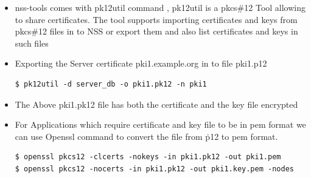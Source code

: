 \documentclass[12pt]{report}
\begin{document}
\begin{enumerate}[label*=\arabic*.]
\begin{itemize}
            \item nss-tools comes with pk12util command , pk12util is a pkcs\#12 Tool allowing to share certificates. The tool supports importing certificates and keys from pkcs\#12 files in to NSS or export them and also list certificates and keys in such files

            \item Exporting the Server certificate pki1.example.org in to file pki1.p12 
                \begin{lstlisting}[style=BashInputStyle]
$ pk12util -d server_db -o pki1.pk12 -n pki1
                \end{lstlisting}

            \item The Above pki1.pk12 file has both the certificate and the key file encrypted

            \item For Applications which require certificate and key file to be in pem format we can use Openssl command to convert the file from \.p12 to pem format.
                \begin{lstlisting}[style=BashInputStyle]
$ openssl pkcs12 -clcerts -nokeys -in pki1.pk12 -out pki1.pem
$ openssl pkcs12 -nocerts -in pki1.pk12 -out pki1.key.pem -nodes
                \end{lstlisting}
        \end{itemize}
\end{enumerate}
\end{document}
